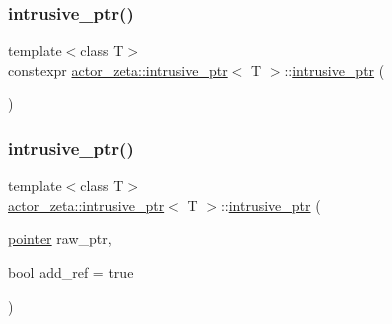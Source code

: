 \subsubsection{\texorpdfstring{intrusive\+\_\+ptr()}{intrusive\_ptr()}\hspace{0.1cm}{\footnotesize\ttfamily [1/5]}}
{\footnotesize\ttfamily template$<$class T$>$ \\
constexpr \hyperlink{classactor__zeta_1_1intrusive__ptr}{actor\+\_\+zeta\+::intrusive\+\_\+ptr}$<$ T $>$\+::\hyperlink{classactor__zeta_1_1intrusive__ptr}{intrusive\+\_\+ptr} (\begin{DoxyParamCaption}{ }\end{DoxyParamCaption})\hspace{0.3cm}{\ttfamily [inline]}}

\mbox{\label{classactor__zeta_1_1intrusive__ptr_aafe5cca9be938943d0708fa406cffc4a}} 
\subsubsection{\texorpdfstring{intrusive\+\_\+ptr()}{intrusive\_ptr()}\hspace{0.1cm}{\footnotesize\ttfamily [2/5]}}
{\footnotesize\ttfamily template$<$class T$>$ \\
\hyperlink{classactor__zeta_1_1intrusive__ptr}{actor\+\_\+zeta\+::intrusive\+\_\+ptr}$<$ T $>$\+::\hyperlink{classactor__zeta_1_1intrusive__ptr}{intrusive\+\_\+ptr} (\begin{DoxyParamCaption}\item[{\hyperlink{classactor__zeta_1_1intrusive__ptr_a149a1cdd3f154db67d7f53a371bfc4e4}{pointer}}]{raw\+\_\+ptr,  }\item[{bool}]{add\+\_\+ref = {\ttfamily true} }\end{DoxyParamCaption})\hspace{0.3cm}{\ttfamily [inline]}}

\mbox{\label{classactor__zeta_1_1intrusive__ptr_afd30f2ec4f89a30a5b78915187ff5f6b}} 
